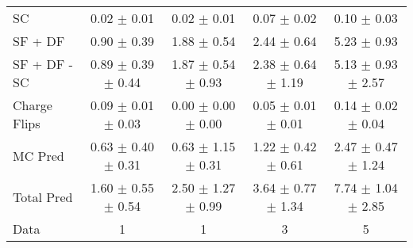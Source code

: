 \begin{tabular}{l|cccc}
                                 SC &  0.02 $\pm$  0.01 &  0.02 $\pm$  0.01 &  0.07 $\pm$  0.02 &  0.10 $\pm$  0.03 \\
                            SF + DF &  0.90 $\pm$  0.39 &  1.88 $\pm$  0.54 &  2.44 $\pm$  0.64 &  5.23 $\pm$  0.93 \\
\hline
                       SF + DF - SC &  0.89 $\pm$  0.39 $\pm$  0.44 &  1.87 $\pm$  0.54 $\pm$  0.93 &  2.38 $\pm$  0.64 $\pm$  1.19 &  5.13 $\pm$  0.93 $\pm$  2.57 \\
\hline\hline
                       Charge Flips &  0.09 $\pm$  0.01 $\pm$  0.03 &  0.00 $\pm$  0.00 $\pm$  0.00 &  0.05 $\pm$  0.01 $\pm$  0.01 &  0.14 $\pm$  0.02 $\pm$  0.04 \\
\hline
                            MC Pred &  0.63 $\pm$  0.40 $\pm$  0.31 &  0.63 $\pm$  1.15 $\pm$  0.31 &  1.22 $\pm$  0.42 $\pm$  0.61 &  2.47 $\pm$  0.47 $\pm$  1.24 \\
\hline
                         Total Pred &  1.60 $\pm$  0.55 $\pm$  0.54 &  2.50 $\pm$  1.27 $\pm$  0.99 &  3.64 $\pm$  0.77 $\pm$  1.34 &  7.74 $\pm$  1.04 $\pm$  2.85 \\
\hline\hline
                               Data &     1 &     1 &     3 &     5 \\
\hline\hline
\end{tabular}

